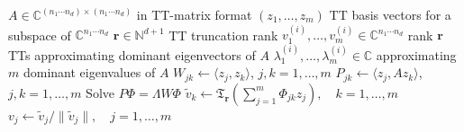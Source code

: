 \documentclass[10pt,preprint]{elsarticle}
\begin{document}
\begin{algorithm}
\caption{Rayleigh–Ritz projection with rank truncation}
\label{alg:TT-Rayleigh-Ritz}
\begin{algorithmic}[1]
\Require
\Statex \hspace{1em} $A \in \mathbb{C}^{(n_1\cdots n_d) \times (n_1\cdots n_d)}$ in TT-matrix format
\Statex \hspace{1em} $(z_1,\ldots,z_m)$ TT basis vectors for a subspace of $\mathbb{C}^{n_1\cdots n_d}$
\Statex \hspace{1em} $\bm r \in \mathbb{N}^{d+1}$ TT truncation rank
\Ensure
\Statex \hspace{1em} 
$v_1^{(i)}, \ldots, v_m^{(i)} \in \mathbb{C}^{n_1 \cdots n_d}$ rank $\bm r$ TTs approximating dominant eigenvectors of $A$ 
\Statex \hspace{1em} 
$\lambda_1^{(i)}, \ldots, \lambda_m^{(i)} \in \mathbb{C}$ approximating $m$ dominant eigenvalues of $A$
\vspace{0.5em}
\State $W_{jk} \gets \langle z_j, z_k \rangle$, \quad $j,k=1,\ldots,m$ 
\State $P_{jk} \gets \langle z_j, A z_k \rangle$, \quad $j,k=1,\ldots,m$ 
\State Solve $P \Phi = \Lambda W \Phi$ 
\State $\tilde{v}_k \gets \mathfrak{T}_{\bm r}\!\left( \sum_{j=1}^{m} \Phi_{jk} z_j \right), \quad k=1,\ldots,m$ 
\State $v_j \gets \tilde{v}_j / \lVert \tilde{v}_j \rVert, \quad j=1,\ldots,m$ 
\end{algorithmic}
\end{algorithm}

\end{document}
